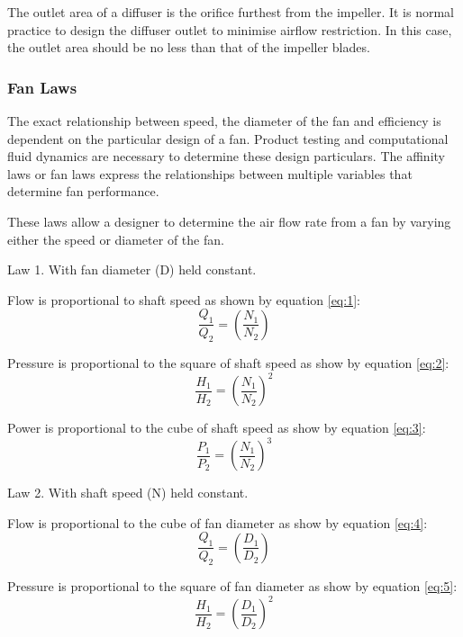 The outlet area of a diffuser is the orifice furthest from the impeller. It is normal practice to design the diffuser outlet to minimise airflow restriction. In this case, the outlet area should be no less than that of the impeller blades.

\subsubsection{Fan Laws}

The exact relationship between speed, the diameter of the fan and efficiency is dependent on the particular design of a fan. Product testing and computational fluid dynamics are necessary to determine these design particulars. The affinity laws or fan laws express the relationships between multiple variables that determine fan performance.
\par
These laws allow a designer to determine the air flow rate from a fan by varying either the speed or diameter of the fan.
\par
Law 1. With fan diameter (D) held constant.
\par
Flow is proportional to shaft speed as shown by equation \ref{eq:1}:
\begin{equation}
\label{eq:1}
\frac{Q_1}{Q_2} = \left(\frac{N_1}{N_2}\right)
\end{equation}

Pressure is proportional to the square of shaft speed as show by equation \ref{eq:2}:
\begin{equation}
\label{eq:2}
\frac{H_1}{H_2} = \left(\frac{N_1}{N_2}\right)^2
\end{equation}

Power is proportional to the cube of shaft speed as show by equation \ref{eq:3}:
\begin{equation}
\label{eq:3}
    \frac{P_1}{P_2} = \left(\frac{N_1}{N_2}\right)^3
\end{equation}

Law 2. With shaft speed (N) held constant.
\par
Flow is proportional to the cube of fan diameter as show by equation \ref{eq:4}:
\begin{equation}
\label{eq:4}
    \frac{Q_1}{Q_2} = \left(\frac{D_1}{D_2}\right)
\end{equation}

Pressure is proportional to the square of fan diameter as show by equation \ref{eq:5}:
\begin{equation}
\label{eq:5}
    \frac{H_1}{H_2} = \left(\frac{D_1}{D_2}\right)^2
\end{equation}

